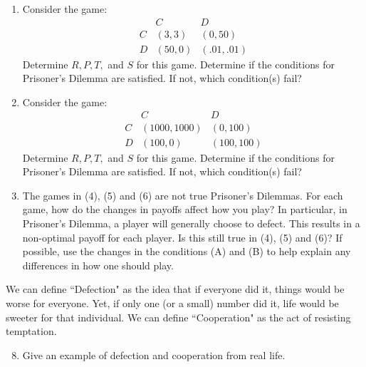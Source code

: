 \begin{enumerate}
\item Consider the game:
$$\begin{matrix}
& C& D\\
C& (3, 3) & (0, 50)\\
D &(50, 0) & (.01, .01)
\end{matrix}$$
Determine $R, P, T,$ and $S$ for this game. Determine if the conditions for Prisoner's Dilemma are satisfied. If not, which condition(s) fail?


\item Consider the game:
$$\begin{matrix}
& C& D\\
C& (1000, 1000) & (0, 100)\\
D &(100, 0) & (100, 100)
\end{matrix}$$
Determine $R, P, T,$ and $S$ for this game. Determine if the conditions for Prisoner's Dilemma are satisfied. If not, which condition(s) fail?

\item The games in (4), (5) and (6) are not true Prisoner's Dilemmas. For each game, how do the changes in payoffs affect how you play? In particular, in Prisoner's Dilemma, a player will generally choose to defect. This results in a non-optimal payoff for each player. Is this still true in (4), (5) and (6)? If possible, use the changes in the conditions (A) and (B) to help explain any differences in how one should play. 

\end{enumerate}

We can define ``Defection" as the idea that if everyone did it, things would be worse for everyone. Yet, if only one (or a small) number did it, life would be sweeter for that individual. We can define ``Cooperation" as the act of resisting temptation.

\begin{enumerate}
\setcounter{enumi}{7}

\item Give an example of defection and cooperation from real life.


\end{enumerate}




 